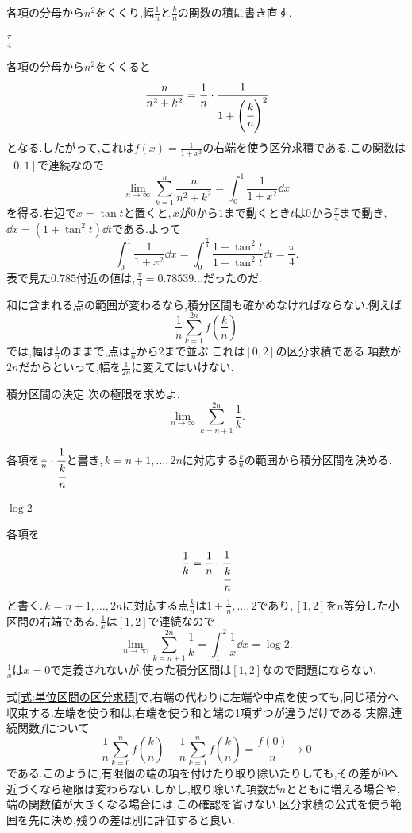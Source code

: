 各項の分母から$n^2$をくくり,幅$\frac1n$と$\frac kn$の関数の積に書き直す.

$\frac{\pi}{4}$

各項の分母から$n^2$をくくると
\[
 \frac{n}{n^2+k^2}
 =\frac1n\cdot\cfrac{1}{1+\left(\cfrac{k}{n}\right)^2}
\]
となる.したがって,これは$f(x)=\frac1{1+x^2}$の右端を使う区分求積である.この関数は$[0,1]$で連続なので
\[
 \lim_{n\to\infty}\sum_{k=1}^{n}\frac{n}{n^2+k^2}
 =\int_0^1\frac{1}{1+x^2}\dd x
\]
を得る.右辺で$x=\tan t$と置くと,\,$x$が$0$から$1$まで動くとき$t$は$0$から$\frac\pi4$まで動き,\,$\dd x=(1+\tan^2t)\dd t$である.よって
\[
 \int_0^1\frac{1}{1+x^2}\dd x
 =\int_0^{\frac\pi4}\frac{1+\tan^2t}{1+\tan^2t}\dd t
 =\frac{\pi}{4}.
\]
表で見た$0.785$付近の値は,\,$\frac\pi4=0.78539\ldots$だったのだ.

和に含まれる点の範囲が変わるなら,積分区間も確かめなければならない.例えば
\[
 \frac1n\sum_{k=1}^{2n}f\left(\frac{k}{n}\right)
\]
では,幅は$\frac1n$のままで,点は$\frac1n$から$2$まで並ぶ.これは$[0,2]$の区分求積である.項数が$2n$だからといって,幅を$\frac1{2n}$に変えてはいけない.

\begin{example}{積分区間の決定}
次の極限を求めよ.
\[
 \lim_{n\to\infty}\sum_{k=n+1}^{2n}\frac1k.
\]
\end{example}

各項を$\frac1n\cdot\cfrac1{\cfrac kn}$と書き,\,$k=n+1,\ldots,2n$に対応する$\frac kn$の範囲から積分区間を決める.

$\log2$

各項を
\[
 \frac1k=\frac1n\cdot\cfrac1{\cfrac{k}{n}}
\]
と書く.\,$k=n+1,\ldots,2n$に対応する点$\frac kn$は$1+\frac1n,\ldots,2$であり,\,$[1,2]$を$n$等分した小区間の右端である.\,$\frac1x$は$[1,2]$で連続なので
\[
 \lim_{n\to\infty}\sum_{k=n+1}^{2n}\frac1k
 =\int_1^2\frac1x\dd x
 =\log2.
\]
$\frac1x$は$x=0$で定義されないが,使った積分区間は$[1,2]$なので問題にならない.

式\eqref{式:単位区間の区分求積}で,右端の代わりに左端や中点を使っても,同じ積分へ収束する.左端を使う和は,右端を使う和と端の1項ずつが違うだけである.実際,連続関数$f$について
\[
 \frac1n\sum_{k=0}^{n}f\left(\frac{k}{n}\right)
 -\frac1n\sum_{k=1}^{n}f\left(\frac{k}{n}\right)
 =\frac{f(0)}n
 \longrightarrow0
\]
である.このように,有限個の端の項を付けたり取り除いたりしても,その差が$0$へ近づくなら極限は変わらない.しかし,取り除いた項数が$n$とともに増える場合や,端の関数値が大きくなる場合には,この確認を省けない.区分求積の公式を使う範囲を先に決め,残りの差は別に評価すると良い.

